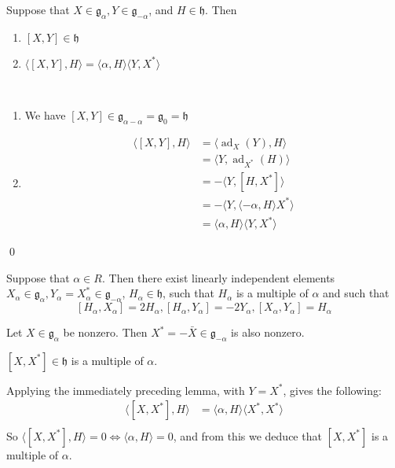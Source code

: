 \documentclass[x11names,reqno,14pt]{extarticle}
\newcommand{\mk}[1]{\mathfrak{#1}}
\newcommand{\g}{\mk{g}}
\newcommand{\h}{\mk{h}}
\DeclareMathOperator{\ad}{ad}
\begin{document}
\lem

Suppose that $X \in \g_\alpha, Y \in \g_{-\alpha}$, and $H \in \h$. Then 
\begin{enumerate}[label=(\alph*)]

\item $[X, Y] \in \h$

\item $\langle [X, Y ], H \rangle = \langle\alpha, H\rangle \langle Y, X^* \rangle$

\end{enumerate}

\proof
\,

\begin{enumerate}[label=(\alph*)]

\item We have $[X, Y] \in \g_{\alpha-\alpha} = \g_0 = \h$ 

\item 
\begin{align*}
\langle [X, Y], H \rangle &  = \langle\ad_X(Y),H\rangle \\&= \langle Y, \ad_{X^*}(H)\rangle\\&= -\langle Y, [H,X^*]\rangle \\ & = -\langle Y, \langle-\alpha, H \rangle X^*\rangle \\
& = \langle\alpha, H\rangle\langle Y, X^*\rangle
\end{align*}

\end{enumerate}

\qed

\thm

Suppose that $\alpha\in R$. Then there exist linearly independent elements $X_\alpha\in\g_{\alpha},Y_\alpha=X_\alpha^*\in\g_{-\alpha}$, $H_\alpha\in\h$, such that $H_\alpha$ is a multiple of $\alpha$ and such that 
\[
[H_\alpha,X_\alpha] = 2H_\alpha, [H_\alpha,Y_\alpha] = -2Y_\alpha, [X_\alpha,Y_\alpha] = H_\alpha
\]

\proof

Let $X \in \g_\alpha$ be nonzero. Then $X^*=-\bar{X}\in\g_{-\alpha}$ is also nonzero. 

\claim
$[X,X^*]\in\h$ is a multiple of $\alpha$. 

\proof

Applying the immediately preceding lemma, with $Y = X^*$, gives the following:
\begin{align*}
\langle[X,X^*],H\rangle & = \langle\alpha,H\rangle\langle X^*, X^*\rangle \\ 
\end{align*}
So $\langle[X,X^*],H\rangle=0 \iff \langle\alpha, H \rangle = 0$, and from this we deduce that $[X,X^*]$ is a multiple of $\alpha$. 
\end{document}
